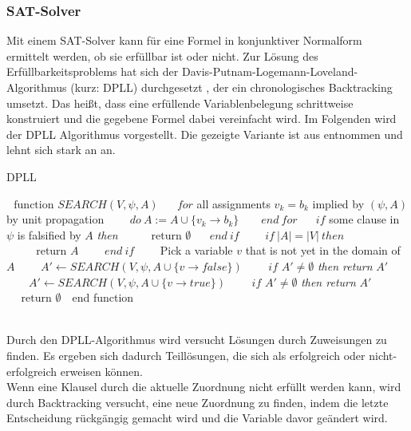 \documentclass[a4,abstract=on]{scrartcl}
\begin{document}
\subsubsection{SAT-Solver}
Mit einem SAT-Solver kann für eine Formel in konjunktiver Normalform ermittelt werden, ob sie erfüllbar ist oder nicht. Zur Lösung des Erfüllbarkeitsproblems hat sich der Davis-Putnam-Logemann-Loveland-Algorithmus (kurz: DPLL) durchgesetzt \cite[vgl.][]{dpll}, der ein chronologisches Backtracking umsetzt. Das heißt, dass eine erfüllende Variablenbelegung schrittweise konstruiert und die gegebene Formel dabei vereinfacht wird. Im Folgenden wird der DPLL Algorithmus vorgestellt. Die gezeigte Variante ist aus \citet[][]{algoDpll} entnommen und lehnt sich stark an \citet[][]{satisfiability} an.

\FloatBarrier
\begin{algorithm}[h]
\caption{DPLL}
\label{alg:dpll}
\begin{algorithmic}

\State $\text{~~function~}SEARCH(V,\psi,A) $
\State $\text{~~~~}for$ all assignments $v_k=b_k$ implied by $(\psi, A)$ by unit propagation 
\State $\text{~~~~~~}do {~}A:=A\cup\{v_k \rightarrow b_k\}$
\State $\text{~~~~ }end {~} for$
\State $\text{~~~~}if $ some clause in $\psi$ is falsified by $A$ \textit{then}
\State $\text{~~~~~~~~return } \emptyset$
\State $\text{~~~~}end {~} if$
\State $\text{~~~~~~}if {~} |A| = |V| {~} then$
\State $\text{~~~~~~~~return } A$
\State $\text{~~~~~~} end {~} if$
\State $\text{~~~~~~}$Pick a variable $v$ that is not yet in the domain of $A$
\State $\text{~~~~~~} A' \leftarrow SEARCH(V,\psi,A\cup\{v \rightarrow false\})$
\State $\text{~~~~~~}if$ $A' \neq \emptyset$ \textit{then return} $A'$
\State $\text{~~~~~~}A' \leftarrow SEARCH(V,\psi, A \cup \{v \rightarrow true\})$
\State $\text{~~~~~~}if$ $A' \neq \emptyset$ \textit{then return} $A'$
\State $\text{~~~~return }\emptyset$
\State $\text{~~}$end function
\end{algorithmic}
\end{algorithm}
\FloatBarrier
\ \\
Durch den DPLL-Algorithmus wird versucht Lösungen durch Zuweisungen zu finden. Es ergeben sich dadurch Teillösungen, die sich als erfolgreich oder nicht-erfolgreich erweisen können. \\
Wenn eine Klausel durch die aktuelle Zuordnung nicht erfüllt werden kann, wird durch Backtracking versucht, eine neue Zuordnung zu finden, indem die letzte Entscheidung rückgängig gemacht wird und die Variable davor geändert wird. 
\end{document}
